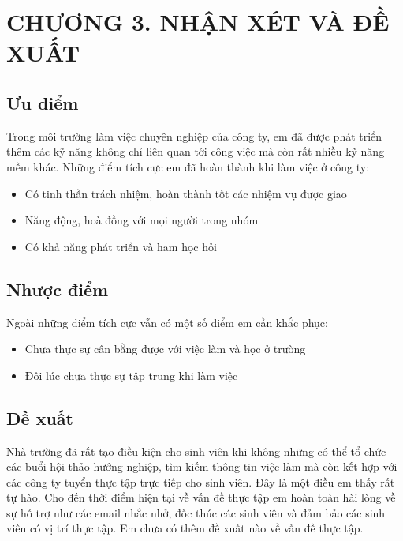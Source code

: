 
\section*{CHƯƠNG 3. NHẬN XÉT VÀ ĐỀ XUẤT}
\setcounter{section}{3}
\setcounter{subsection}{0} %
\setcounter{table}{0} %
\setcounter{figure}{0} %

\subsection{Ưu điểm}
Trong môi trường làm việc chuyên nghiệp của công ty, em đã được phát triển thêm các kỹ năng không chỉ liên quan tới
công việc mà còn rất nhiều kỹ năng mềm khác. Những điểm tích cực em đã hoàn thành khi làm việc ở công ty:
\begin{itemize}
  \item Có tinh thần trách nhiệm, hoàn thành tốt các nhiệm vụ được giao
  \item Năng động, hoà đồng với mọi người trong nhóm
  \item Có khả năng phát triển và ham học hỏi
\end{itemize}

\subsection{Nhược điểm}
Ngoài những điểm tích cực vẫn có một số điểm em cần khắc phục:
\begin{itemize}
  \item Chưa thực sự cân bằng được với việc làm và học ở trường
  \item Đôi lúc chưa thực sự tập trung khi làm việc
\end{itemize}
\subsection{Đề xuất}
Nhà trường đã rất tạo điều kiện cho sinh viên khi không những có thể tổ chức các buổi hội thảo hướng nghiệp, tìm kiếm
thông tin việc làm mà còn kết hợp với các công ty tuyển thực tập trực tiếp cho sinh viên. Đây là một điều em thấy rất tự
hào. Cho đến thời điểm hiện tại về vấn đề thực tập em hoàn toàn hài lòng về sự hỗ trợ như các email nhắc nhở, đốc thúc
các sinh viên và đảm bảo các sinh viên có vị trí thực tập. Em chưa có thêm đề xuất nào về vấn đề thực tập.
\newpage
